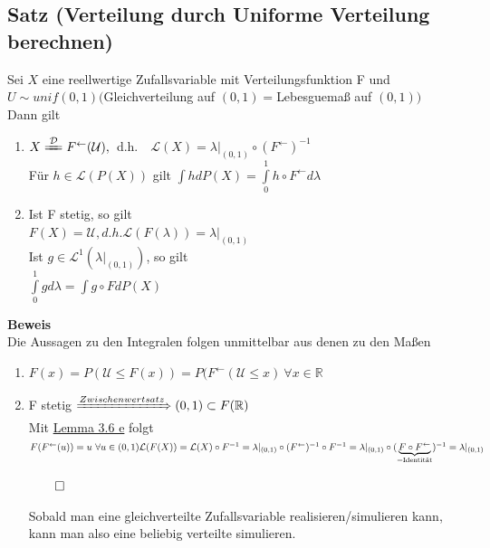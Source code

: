 \documentclass[german,10pt,oneside, fleqn, a4paper]{article}
\newcommand {\R}	{\mathbb{R}}
\newcommand{\QED}{\begin{flushright}$\qed$\end{flushright}}
\newcommand{\mc}[1]{\mathcal{#1}}
\newcommand{\lp}[1]{\mc{L}^{#1}}
\newcommand{\beweis}{\textbf{Beweis}\\}
\newcommand{\1}[1]{1_{#1}}
\newcommand{\2}[1]{\1{\brac{#1}}}
\newcommand{\inv}{^\leftarrow}
\begin{document}
\subsection{Satz (Verteilung durch Uniforme Verteilung berechnen)}
\label{3.7}
Sei $X$ eine reellwertige Zufallsvariable mit Verteilungsfunktion F und\\
$U\sim unif(0,1) ($Gleichverteilung auf $(0,1)=$Lebesguemaß auf $(0,1))$\\
Dann gilt\begin{enumerate}[label=(\alph*)]
\item $X\xlongequal{\mc{D}}F\inv(\mc{U}),$\ d.h.\ \ $\mc{L}(X)=\lambda |_{(0,1)}\circ (F\inv)^{-1}$\\
Für $h\in\mc{L}(P(X))$ gilt $\int hdP(X)=\int\limits_0^1h\circ F\inv d\lambda$
\item Ist F stetig, so gilt\\
$F(X)=\mc{U}, d.h. \mc{L}(F(\lambda))=\lambda|_{(0,1)}$\\
Ist $g\in\lp{1}(\lambda|_{(0,1)})$, so gilt\\
$\int\limits_0^1gd\lambda=\int g\circ F dP(X)$
\end{enumerate}
\beweis
Die Aussagen zu den Integralen folgen unmittelbar aus denen zu den Maßen
\begin{enumerate}[label=(\alph*)]
\item $F(x)=P(\mc{U}\leq F(x))=P(F\inv(\mc{U}\leq x)\ \forall x\in\R$
\item F stetig $\xRightarrow{Zwischenwertsatz}(0,1)\subset F(\R)$\\
Mit \hyperref[3.6]{Lemma 3.6 e} folgt $F(F\inv(u))=u\ \forall u\in(0,1)\\
\mc{L}(F(X))=\mc{L}(X)\circ F^{-1}=\lambda|_{(0,1)}\circ(F\inv)^{-1}\circ F^{-1}\\
=\lambda|_{(0,1)}\circ (\underbrace{F\circ F\inv}_{\text{=Identität}})^{-1}=\lambda|_{(0,1)}$\QED
Sobald man eine gleichverteilte Zufallsvariable realisieren/simulieren kann, kann man also eine beliebig verteilte simulieren.
\end{enumerate}
\end{document}
